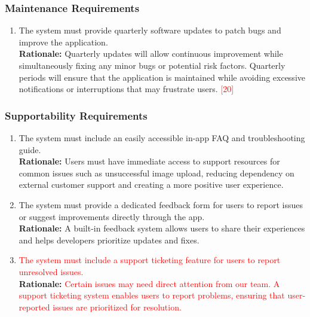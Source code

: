 \documentclass{article}
\begin{document}
\subsubsection{Maintenance Requirements}
\label{ssub:maintenance_requirements}
\begin{enumerate}[{MS-M}1. ]
	\item The system must provide quarterly software updates to patch bugs and improve the application.\\
	\textbf{Rationale:} Quarterly updates will allow continuous improvement while simultaneously fixing any minor bugs or potential risk factors. Quarterly periods will ensure that the application is maintained while avoiding excessive notifications or interruptions that may frustrate users. \textcolor{red}{[20]}
\end{enumerate}

\subsubsection{Supportability Requirements}
\label{ssub:supportability_requirements}
\begin{enumerate}[{MS-S}1. ]
	\item The system must include an easily accessible in-app FAQ and troubleshooting guide. \\
    \textbf{Rationale: }Users must have immediate access to support resources for common issues such as unsuccessful image upload,   reducing dependency on external customer support and creating a more positive user experience.
	\item The system must provide a dedicated feedback form for users to report issues or suggest improvements directly through the app. \\
    \textbf{Rationale:} A built-in feedback system allows users to share their experiences and helps developers prioritize updates and fixes.
	\item \textcolor{red}{The system must include a support ticketing feature for users to report unresolved issues.}\\
	\textbf{Rationale:} \textcolor{red}{Certain issues may need direct attention from our team. A support ticketing system enables users to report problems, ensuring that user-reported issues are prioritized for resolution.}\\
\end{enumerate}
\end{document}
